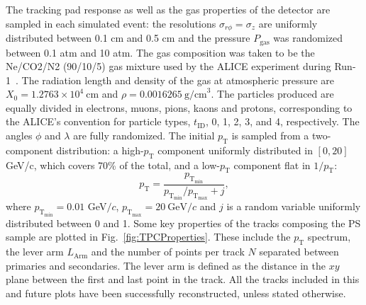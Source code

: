 The tracking pad response as well as the gas properties of the detector are sampled in each simulated event: the resolutions $\sigma_{r\phi}=\sigma_z$ are uniformly distributed between 0.1 cm and 0.5 cm and the pressure $P_\textrm{gas}$ was randomized between 0.1 atm and 10 atm. The gas composition was taken to be the Ne/CO2/N2 (90/10/5) gas mixture used by the ALICE experiment during Run-1~\cite{ALICE:2008ngc}. The radiation length and density of the gas at atmospheric pressure are $X_0=1.2763\times10^4 \ \text{cm}$ and $\rho = 0.0016265 \ \text{g/cm}^3$. The particles produced are equally divided in electrons, muons, pions, kaons and protons, corresponding to the ALICE’s convention for particle types, $t_{\textrm{ID}}$, 0, 1, 2, 3, and 4, respectively. The angles $\phi$ and $\lambda$ are fully randomized. The initial $p_{\textrm{T}}$ is sampled from a two-component distribution: a high-$p_{\text{T}}$ component uniformly distributed in $[0,20]$ GeV/c, which covers 70\% of the total, and a low-$p_{\text{T}}$ component flat in $1/p_\textrm{T}$:
\begin{equation} \label{eq:LowpT}
   p_{\textrm{T}}=\frac{p_{\textrm{T}_{\textrm{min}}}}{p_{\textrm{T}_{\textrm{min}}}/p_{\textrm{T}_{\textrm{max}}}+j},
\end{equation}
where $p_{\textrm{T}_{\textrm{min}}}=0.01$ GeV$/c$, $p_{\textrm{T}_{\textrm{max}}}=20 \ \text{GeV}/c$ and $j$ is a random variable uniformly distributed between 0 and 1. Some key properties of the tracks composing the PS sample are plotted in Fig.~\ref{fig:TPCProperties}. These include the $p_{\textrm{T}}$ spectrum, the lever arm $L_{\textrm{Arm}}$ and the number of points per track $N$ separated between primaries and secondaries. The lever arm is defined as the distance in the $xy$ plane between the first and last point in the track. All the tracks included in this and future plots have been successfully reconstructed, unless stated otherwise. %

